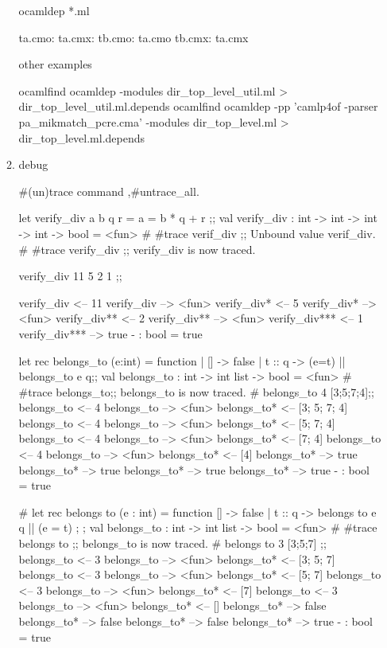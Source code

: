 \begin{enumerate}
\begin{enumerate}
  \begin{ocamlcode}
ocamldep *.ml    
\end{ocamlcode}


\begin{ocamlcode}
ta.cmo:
ta.cmx:
tb.cmo: ta.cmo
tb.cmx: ta.cmx
\end{ocamlcode}

other examples

\begin{bluetext}
ocamlfind ocamldep -modules dir_top_level_util.ml > dir_top_level_util.ml.depends
ocamlfind ocamldep -pp 'camlp4of -parser pa_mikmatch_pcre.cma' -modules dir_top_level.ml > dir_top_level.ml.depends
\end{bluetext}

\item debug

  \#(un)trace command ,\#untrace\_all.
  \begin{alternate}
let verify_div a b q r = a = b * q + r ;;
val verify_div : int -> int -> int -> int -> bool = <fun>
# #trace verif_div ;;
Unbound value verif_div.
# #trace verify_div ;;
verify_div is now traced.
\end{alternate}

\begin{ocamlcode}
verify_div 11 5 2 1 ;;  
\end{ocamlcode}


\begin{ocamlcode}
verify_div <-- 11
verify_div --> <fun>
verify_div* <-- 5
verify_div* --> <fun>
verify_div** <-- 2
verify_div** --> <fun>
verify_div*** <-- 1
verify_div*** --> true
- : bool = true  
\end{ocamlcode}

\begin{bluetext}
let rec belongs_to (e:int) = function 
    | [] -> false 
    | t :: q -> (e=t) || belongs_to e q;;
    val belongs_to : int -> int list -> bool = <fun>
# #trace belongs_to;;
belongs_to is now traced.
# belongs_to 4 [3;5;7;4];;
belongs_to <-- 4
belongs_to --> <fun>
belongs_to* <-- [3; 5; 7; 4]
belongs_to <-- 4
belongs_to --> <fun>
belongs_to* <-- [5; 7; 4]
belongs_to <-- 4
belongs_to --> <fun>
belongs_to* <-- [7; 4]
belongs_to <-- 4
belongs_to --> <fun>
belongs_to* <-- [4]
belongs_to* --> true
belongs_to* --> true
belongs_to* --> true
belongs_to* --> true
- : bool = true
\end{bluetext}

\begin{bluetext}
# let rec belongs to (e : int) = function
[] -> false
| t :: q -> belongs to e q || (e = t) ; ;
val belongs_to : int -> int list -> bool = <fun> # #trace belongs to ;;
belongs_to is now traced.
# belongs to 3 [3;5;7] ;;
belongs_to <-- 3
belongs_to --> <fun>
belongs_to* <-- [3; 5; 7]
belongs_to <-- 3
belongs_to --> <fun>
belongs_to* <-- [5; 7]
belongs_to <-- 3
belongs_to --> <fun>
belongs_to* <-- [7]
belongs_to <-- 3
belongs_to --> <fun>
belongs_to* <-- []
belongs_to* --> false
belongs_to* --> false
belongs_to* --> false
belongs_to* --> true
- : bool = true  
\end{bluetext}



\end{enumerate}
\end{enumerate}
